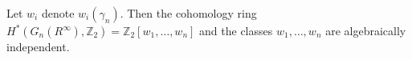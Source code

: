 Let $w_i$ denote $w_i(\gamma_n)$. Then the cohomology ring $H^*(G_n(R^\infty), \mathbb{Z}_2) = \mathbb{Z}_2[w_1, \ldots, w_n]$ and the classes $w_1, \ldots, w_n$ are algebraically independent.
